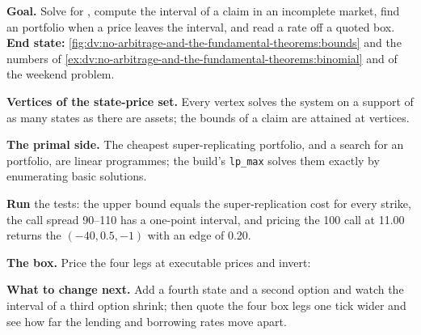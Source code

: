 \begin{tutorial}
\textbf{Goal.} Solve for , compute the  interval of a
claim in an incomplete market, find an  portfolio when a price leaves
the interval, and read a rate off a quoted box. \textbf{End state:}
\cref{fig:dv:no-arbitrage-and-the-fundamental-theorems:bounds} and the numbers of
\cref{ex:dv:no-arbitrage-and-the-fundamental-theorems:binomial} and of the
weekend problem.
\begin{tutsteps}
\item \textbf{Vertices of the state-price set.} Every vertex solves the system on
a support of as many states as there are assets; the bounds of a claim are
attained at vertices.
\label{lst:dv:no-arbitrage-and-the-fundamental-theorems:vertices}
\item \textbf{The primal side.} The cheapest super-replicating portfolio, and a
search for an  portfolio, are linear programmes; the build's
\texttt{lp\_max} solves them exactly by enumerating basic solutions.
\label{lst:dv:no-arbitrage-and-the-fundamental-theorems:lp}
\item \textbf{Run} the tests: the upper bound equals the super-replication cost
for every strike, the call spread 90--110 has a one-point interval, and pricing
the 100 call at 11.00 returns the  $(-40, 0.5, -1)$ with an edge of 0.20.
\item \textbf{The box.} Price the four legs at executable prices and invert:
\label{lst:dv:no-arbitrage-and-the-fundamental-theorems:box}
\end{tutsteps}
\textbf{What to change next.} Add a fourth state and a second option and watch
the interval of a third option shrink; then quote the four box legs one tick
wider and see how far the lending and borrowing rates move apart.
\end{tutorial}

